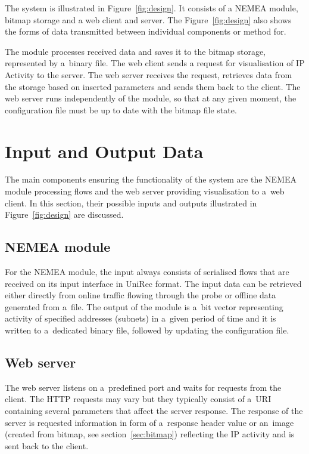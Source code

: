 The system is illustrated in Figure~\ref{fig:design}. It consists of a NEMEA module, bitmap storage and
a web client and server. The Figure~\ref{fig:design} also shows the forms of data
transmitted between individual components or method for.

The module processes received data and saves it to the bitmap storage, represented by a~binary file.
The web client sends a request for visualisation of IP Activity to the server. The web server receives the request, retrieves data
from the storage based on inserted parameters and sends them back to the client. The web server runs independently of the module,
so that at any given moment, the configuration file must be up to date with the bitmap file state.

\section{Input and Output Data}
The main components ensuring the functionality of the system are the NEMEA module processing flows and the web server
providing visualisation to a~web client.
In this section, their possible inputs and outputs illustrated in Figure~\ref{fig:design} are discussed.

\subsection{NEMEA module}
For the NEMEA module, the input always consists of serialised flows that are received on its input interface in UniRec format.
The input data can be retrieved either directly from online traffic flowing through the probe or offline data generated from a~file.
The output of the module is a~bit vector representing activity of specified addresses (subnets) in a~given period of time and
it is written to a~dedicated binary file, followed by updating the configuration file.

\subsection{Web server}
The web server listens on a~predefined port and waits for requests from the client.
The HTTP requests may vary but they typically consist of a~URI containing several parameters that affect the server response.
The response of the server is requested information in form of a~response header value or an~image
(created from bitmap, see section~\ref{sec:bitmap}) reflecting the IP activity and
is sent back to the client.

